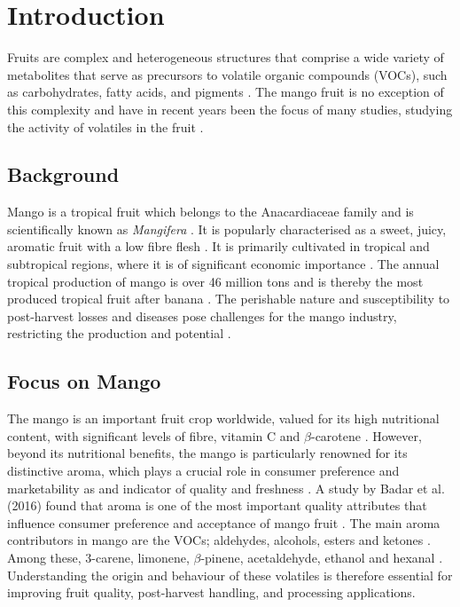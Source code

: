 \setcounter{chapter}{1}
\setcounter{section}{0}
\setlength{\headheight}{12.71342pt}
\addtolength{\topmargin}{-0.71342pt}

\section{Introduction}
Fruits are complex and heterogeneous structures that comprise  a wide variety of metabolites that serve as precursors to volatile organic compounds (VOCs), such as carbohydrates, fatty acids, and pigments \cite*{A03_PanoFarias2017}. The mango fruit is no exception of this complexity and have in recent years been the focus of many studies, studying the activity of volatiles in the fruit \cite*{A04_GUO2023112779}.

\subsection{Background}
Mango is a tropical fruit which belongs to the Anacardiaceae family and is scientifically known as \textit{Mangifera} \cite*{A04_GUO2023112779}. It is popularly characterised as a sweet, juicy, aromatic fruit with a low fibre flesh \cite*{A05_Chin2019}. It is primarily cultivated in tropical and subtropical regions, where it is of significant economic importance \cite*{A05_Chin2019}. 
The annual tropical production of mango is over 46 million tons and is thereby the most produced tropical fruit after banana \cite*{A05_Chin2019, A07_Bonneau2016}. The perishable nature and susceptibility to post-harvest losses and diseases pose challenges for the mango industry, restricting the production and potential \cite*{A05_Chin2019}.

\subsection{Focus on Mango}
The mango is an important fruit crop worldwide, valued for its high nutritional content, with significant levels of fibre, vitamin C and $\beta$-carotene \cite*{A07_Bonneau2016}. However, beyond its nutritional benefits, the mango is particularly renowned for its distinctive aroma, which plays a crucial role in consumer preference and marketability \cite*{A06_Badar2016} as and indicator of quality and freshness \cite*{A05_Chin2019}.
A study by Badar et al. (2016) found that aroma is one of the most important quality attributes that influence consumer preference and acceptance of mango fruit \cite*{A06_Badar2016}. The main aroma contributors in mango are the VOCs; aldehydes, alcohols, esters and ketones \cite*{A02_Moreno2010}. Among these, 3-carene, limonene, $\beta$-pinene, acetaldehyde, ethanol and hexanal \cite*{A02_Moreno2010}. Understanding the origin and behaviour of these volatiles is therefore essential for improving fruit quality, post-harvest handling, and processing applications.

